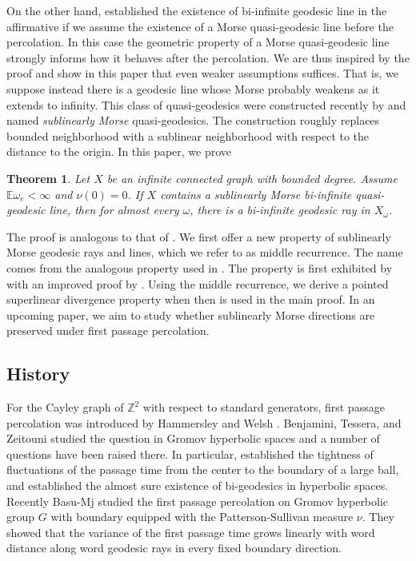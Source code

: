 \documentclass[12 pt]{amsart}
\newcommand{\EE}{\mathbb{E}}
\newcommand{\ZZ}{\mathbb{Z}}
\newtheorem{introthm}{Theorem}
\theoremstyle{definition}
\theoremstyle{remark}
\begin{document}
On the other hand, \cite{BT17} established the existence of bi-infinite geodesic line in the affirmative if we assume the existence of a Morse quasi-geodesic line before the percolation. In this case the geometric property of a Morse quasi-geodesic line strongly informs how it behaves after the percolation. We are thus inspired by the proof and show in this paper that even weaker assumptions suffices. That is, we suppose instead there is a geodesic line whose Morse probably weakens as it extends to infinity. This class of quasi-geodesics were constructed recently by \cite{QRT1,QRT2} and named \emph{sublinearly Morse } quasi-geodesics. The construction roughly replaces bounded neighborhood with a sublinear neighborhood with respect to the distance to the origin. In this paper, we prove
\begin{introthm}\label{introthm1}
Let $X$ be an infinite connected graph with bounded degree. Assume $\EE \omega_e < \infty$ and $\nu(0) = 0$. If $X$ contains a sublinearly Morse bi-infinite quasi-geodesic line, then for almost every $\omega$, there is a bi-infinite geodesic ray in $X_\omega$.
\end{introthm}
The proof is analogous to that of \cite{BT17}. We first offer a new property of sublinearly Morse geodesic rays and lines, which we refer to as middle recurrence. The name comes from the analogous property used in \cite{BT17}. The property is first exhibited by \cite{DMS} with an improved proof by \cite{ADT}. Using the middle recurrence, we derive a pointed superlinear divergence property when then is used in the main proof. In an upcoming paper, we aim to study whether sublinearly Morse directions are preserved under first passage percolation.
\subsection*{History}
For the Cayley graph of $\ZZ^2$ with respect to standard generators, first passage percolation was introduced by Hammersley and Welsh \cite{HW65}.  Benjamini, Tessera, and Zeitouni \cite{BZ12, BT17} studied the question in Gromov hyperbolic spaces and a number of questions have been raised there. In particular, \cite{BZ12} established the tightness of fluctuations of the passage time from the center to the boundary of a large ball, and \cite{BT17} established the almost sure existence of bi-geodesics in hyperbolic spaces. Recently Basu-Mj \cite{BM22} studied the first passage percolation on Gromov hyperbolic group $G$ with boundary equipped with the Patterson-Sullivan measure $\nu$. They showed that the variance of the first passage time grows linearly with word distance along word geodesic rays in every fixed boundary direction.
\end{document}
